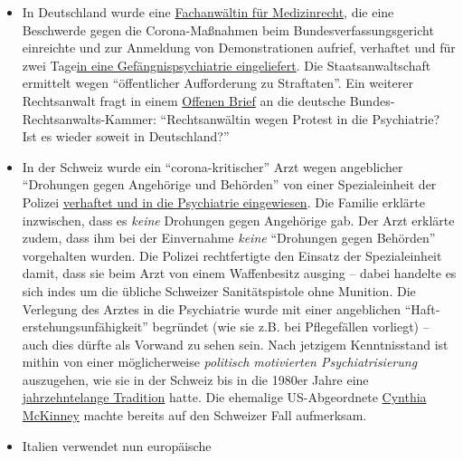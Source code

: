 \begin{itemize}
\tightlist
\item
  In Deutschland wurde eine \href{http://beatebahner.de/}{Fachanwältin
  für Medizinrecht}, die eine Beschwerde gegen die Corona-Maßnahmen beim
  Bundesverfassungsgericht einreichte und zur Anmeldung von
  Demonstrationen aufrief, verhaftet und für zwei
  Tage\href{https://www.rnz.de/nachrichten/heidelberg_artikel,-nach-aufruf-zu-corona-demo-heidelberger-anwaeltin-in-psychiatrischer-einrichtung-update-_arid,508747.html}{in
  eine Gefängnispsychiatrie eingeliefert}. Die Staatsanwaltschaft
  ermittelt wegen ``öffentlicher Aufforderung zu Straftaten''. Ein
  weiterer Rechtsanwalt fragt in einem
  \href{https://archive.is/20200415172607/https://www.nachrichtenspiegel.de/2020/04/14/brief-an-die-bundesrechtsanwaltskammer-in-causa-bahmer/}{Offenen
  Brief} an die deutsche Bundes-Rechtsanwalts-Kammer: ``Rechtsanwältin
  wegen Protest in die Psychiatrie? Ist es wieder soweit in
  Deutschland?''
\item
  In der Schweiz wurde ein ``corona-kritischer'' Arzt wegen angeblicher
  ``Drohungen gegen Angehörige und Behörden'' von einer Spezialeinheit
  der Polizei
  \href{https://www.srf.ch/news/regional/aargau-solothurn/festnahme-von-corona-kritiker-verschwoerung-oder-normale-intervention-der-aargauer-behoerden}{verhaftet
  und in die Psychiatrie eingewiesen}. Die Familie erklärte inzwischen,
  dass es \emph{keine} Drohungen gegen Angehörige gab. Der Arzt erklärte
  zudem, dass ihm bei der Einvernahme \emph{keine} ``Drohungen gegen
  Behörden'' vorgehalten wurden. Die Polizei rechtfertigte den Einsatz
  der Spezialeinheit damit, dass sie beim Arzt von einem Waffenbesitz
  ausging -- dabei handelte es sich indes um die übliche Schweizer
  Sanitätspistole ohne Munition. Die Verlegung des Arztes in die
  Psychiatrie wurde mit einer angeblichen
  ``Haft­erstehungs­unfähigkeit'' begründet (wie sie z.B. bei
  Pflegefällen vorliegt) -- auch dies dürfte als Vorwand zu sehen sein.
  Nach jetzigem Kenntnisstand ist mithin von einer möglicher­weise
  \emph{politisch motivierten Psychiatrisierung} auszugehen, wie sie in
  der Schweiz bis in die 1980er Jahre eine
  \href{https://www.revue.ch/ausgaben/2019/06/detail/news/detail/News/als-die-schweiz-arme-und-unangepasste-wegsperrte-1/}{jahrzehntelange
  Tradition} hatte. Die ehemalige US-Abgeordnete
  \href{https://twitter.com/cynthiamckinney/status/1250075810838581248}{Cynthia
  McKinney} machte bereits auf den Schweizer Fall aufmerksam.
\item
  Italien verwendet nun europäische

\end{itemize}
